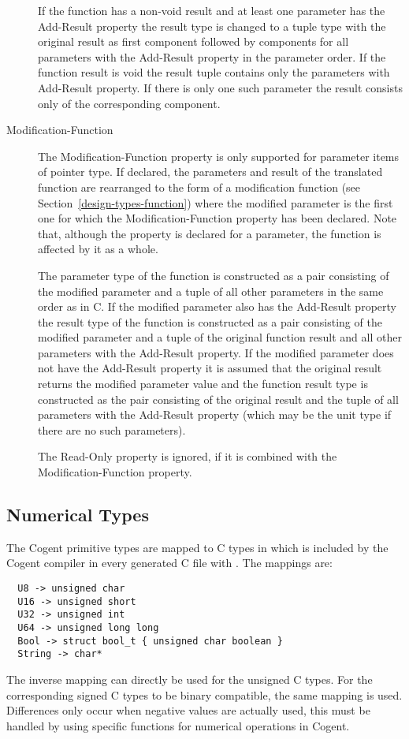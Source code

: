 \begin{description}
If the function has a non-void result and at least one parameter has the Add-Result property the result type is changed
to a tuple type with the original result as first component followed by components for all parameters with the Add-Result
property in the parameter order. If the function result is void the result tuple contains only the parameters with 
Add-Result property. If there is only one such parameter the result consists only of the corresponding component.

\item[Modification-Function]

The Modification-Function property is only supported for parameter items of pointer type. If declared, the parameters and
result of the translated function are rearranged to the form of a modification function (see 
Section~\ref{design-types-function}) where the modified parameter is the first one for which the Modification-Function 
property has been declared. Note that, although the property is declared for a parameter, the function is affected
by it as a whole.

The parameter type of the function is constructed as a pair consisting of the modified parameter and a tuple of all 
other parameters in the same order as in C. If the modified parameter also has the Add-Result property the result type 
of the function is constructed as a pair consisting of the modified parameter and a tuple of the original function result
and all other parameters with the Add-Result property. If the modified parameter does not have the Add-Result property
it is assumed that the original result returns the modified parameter value and the function result type is constructed 
as the pair consisting of the original result and the tuple of all parameters with the Add-Result property (which may 
be the unit type if there are no such parameters).

The Read-Only property is ignored, if it is combined with the Modification-Function property.

\end{description}

\subsection{Numerical Types}
\label{design-types-prim}

The Cogent primitive types are mapped to C types in  which is included by the Cogent compiler
in every generated C file with . The mappings are: 
\begin{verbatim}
  U8 -> unsigned char
  U16 -> unsigned short 
  U32 -> unsigned int
  U64 -> unsigned long long
  Bool -> struct bool_t { unsigned char boolean }
  String -> char*
\end{verbatim}
The inverse mapping can directly be used for the unsigned C types. For the corresponding signed C types to be binary
compatible, the same mapping is used. Differences only occur when negative values are actually used, this must be handled by using specific functions for numerical operations in Cogent.

